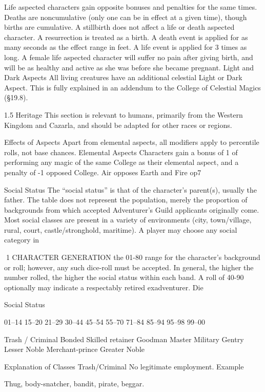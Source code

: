 \documentclass[a4paper]{article}
\begin{document}
\begin{multicols}{3}
Life aspected characters gain opposite bonuses and
penalties for the same times. Deaths are noncumulative (only one can be in effect at a given
time), though births are cumulative. A stillbirth
does not affect a life or death aspected character. A
resurrection is treated as a birth.
A death event is applied for as many seconds as the
effect range in feet. A life event is applied for 3
times as long.
A female life aspected character will suffer no pain
after giving birth, and will be as healthy and active
as she was before she became pregnant.
Light and Dark Aspects
All living creatures have an additional celestial
Light or Dark Aspect. This is fully explained in an
addendum to the College of Celestial Magics
(§19.8).

1.5 Heritage
This section is relevant to humans, primarily from
the Western Kingdom and Cazarla, and should be
adapted for other races or regions.

Effects of Aspects
Apart from elemental aspects, all modifiers apply
to percentile rolls, not base chances.
Elemental Aspects
Characters gain a bonus of 1%
of performing any magic of the same College as
their elemental aspect, and a penalty of -1%
opposed College. Air opposes Earth and Fire op7

Social Status
The “social status” is that of the character’s parent(s), usually the father. The table does not represent the population, merely the proportion of backgrounds from which accepted Adventurer’s Guild
applicants originally come. Most social classes are
present in a variety of environments (city,
town/village, rural, court, castle/stronghold, maritime). A player may choose any social category in

1 CHARACTER GENERATION
the 01-80 range for the character’s background or
roll; however, any such dice-roll must be accepted.
In general, the higher the number rolled, the higher
the social status within each band. A roll of 40-90
optionally may indicate a respectably retired exadventurer.
Die

Social Status

01–14
15–20
21–29
30–44
45–54
55–70
71–84
85–94
95–98
99–00

Trash / Criminal
Bonded
Skilled retainer
Goodman
Master
Military
Gentry
Lesser Noble
Merchant-prince
Greater Noble

Explanation of Classes
Trash/Criminal No legitimate employment.
Example

Thug, body-snatcher, bandit, pirate, beggar.


\end{multicols}
\end{document}
